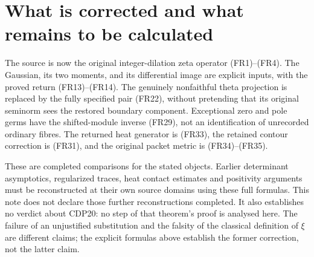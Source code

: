 \documentclass[11pt]{article}
\begin{document}
\section{What is corrected and what remains to be calculated}
The source is now the original integer-dilation zeta operator (FR1)--(FR4). The Gaussian, its two moments, and its differential image are explicit inputs, with the proved return (FR13)--(FR14). The genuinely nonfaithful theta projection is replaced by the fully specified pair (FR22), without pretending that its original seminorm sees the restored boundary component. Exceptional zero and pole germs have the shifted-module inverse (FR29), not an identification of unrecorded ordinary fibres. The returned heat generator is (FR33), the retained contour correction is (FR31), and the original packet metric is (FR34)--(FR35).

These are completed comparisons for the stated objects. Earlier determinant asymptotics, regularized traces, heat contact estimates and positivity arguments must be reconstructed at their own source domains using these full formulas. This note does not declare those further reconstructions completed. It also establishes no verdict about CDP20: no step of that theorem's proof is analysed here. The failure of an unjustified substitution and the falsity of the classical definition of $\xi$ are different claims; the explicit formulas above establish the former correction, not the latter claim.
\end{document}
